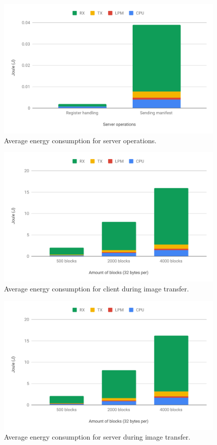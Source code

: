 \documentclass[0-thesis.tex]{subfiles}
\begin{document}
\begin{figure}[h!]
    \caption{Average energy consumption for server operations.}
    \label{fig:server-operations-energy}
    \includegraphics[scale=0.65]{images/server-operations-energy.pdf}
\end{figure}

\begin{figure}[h!]
    \caption{Average energy consumption for client during image transfer.}
    \label{fig:client-image-energy}
    \includegraphics[scale=0.65]{images/client-image-energy.pdf}
\end{figure}

\begin{figure}[h!]
    \caption{Average energy consumption for server during image transfer.}
    \label{fig:server-image-energy}
    \includegraphics[scale=0.65]{images/server-image-energy.pdf}
\end{figure}
\end{document}
